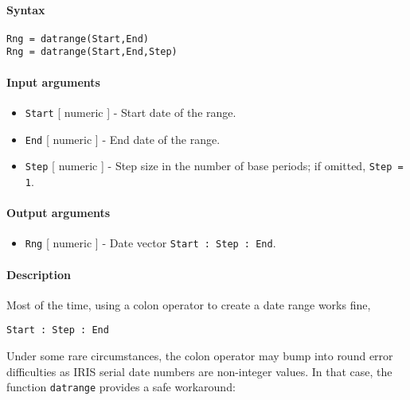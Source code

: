 


	\paragraph{Syntax}\label{syntax}

\begin{verbatim}
Rng = datrange(Start,End)
Rng = datrange(Start,End,Step)
\end{verbatim}

\paragraph{Input arguments}\label{input-arguments}

\begin{itemize}
\item
  \texttt{Start} {[} numeric {]} - Start date of the range.
\item
  \texttt{End} {[} numeric {]} - End date of the range.
\item
  \texttt{Step} {[} numeric {]} - Step size in the number of base
  periods; if omitted, \texttt{Step = 1}.
\end{itemize}

\paragraph{Output arguments}\label{output-arguments}

\begin{itemize}
\itemsep1pt\parskip0pt
\item
  \texttt{Rng} {[} numeric {]} - Date vector
  \texttt{Start : Step : End}.
\end{itemize}

\paragraph{Description}\label{description}

Most of the time, using a colon operator to create a date range works
fine,

\begin{verbatim}
Start : Step : End
\end{verbatim}

Under some rare circumstances, the colon operator may bump into round
error difficulties as IRIS serial date numbers are non-integer values.
In that case, the function \texttt{datrange} provides a safe workaround:

